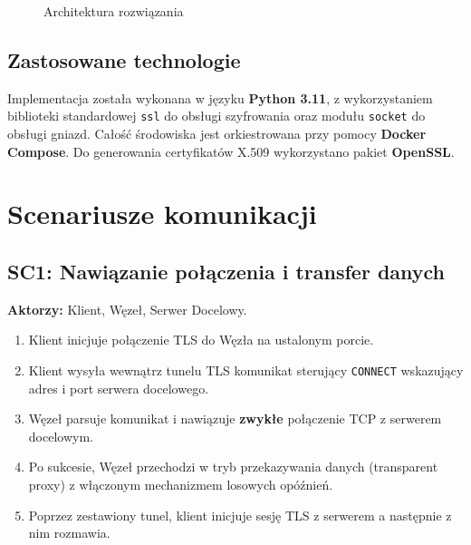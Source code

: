 \documentclass[12pt, a4paper]{article}
\begin{document}
\begin{figure}[h!]
\centering
{}
\caption{Architektura rozwiązania}
\label{fig:arch}
\end{figure}

\subsection{Zastosowane technologie}
Implementacja została wykonana w języku \textbf{Python 3.11}, z wykorzystaniem biblioteki standardowej \texttt{ssl} do obsługi szyfrowania oraz modułu \texttt{socket} do obsługi gniazd. Całość środowiska jest orkiestrowana przy pomocy \textbf{Docker Compose}. Do generowania certyfikatów X.509 wykorzystano pakiet \textbf{OpenSSL}.

\section{Scenariusze komunikacji}

\subsection{SC1: Nawiązanie połączenia i transfer danych}
\textbf{Aktorzy:} Klient, Węzeł, Serwer Docelowy.
\begin{enumerate}
    \item Klient inicjuje połączenie TLS do Węzła na ustalonym porcie.
    \item Klient wysyła wewnątrz tunelu TLS komunikat sterujący \texttt{CONNECT} wskazujący adres
          i port serwera docelowego.
    \item Węzeł parsuje komunikat i nawiązuje \textbf{zwykłe} połączenie TCP z serwerem docelowym.
    \item Po sukcesie, Węzeł przechodzi w tryb przekazywania danych (transparent proxy) z włączonym mechanizmem losowych opóźnień.
    \item Poprzez zestawiony tunel, klient inicjuje sesję TLS z serwerem a następnie z nim rozmawia.
\end{enumerate}
\end{document}
